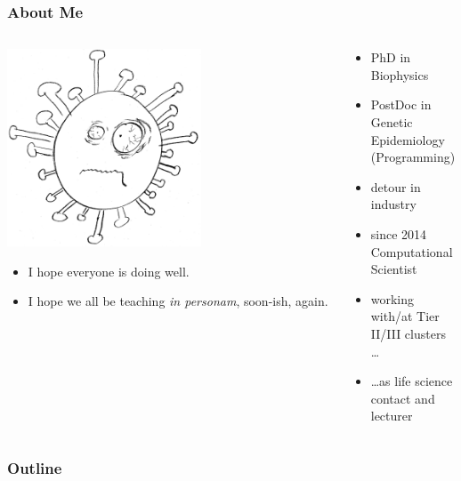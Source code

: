 \documentclass[english,xcolor=pdftex,dvipsnames,compress,aspectratio=169,handout]{beamer}
\begin{document}
\begin{frame}[plain] 
  \frametitle{About Me}
  \begin{columns}
   \begin{column}{0.6\textwidth}
    \centering
    \includegraphics[width=0.6\textwidth]{images/virus}\newline
    {\scriptsize
    \begin{itemize}
     \item I hope everyone is doing well.
     \item I hope we all be teaching \emph{in personam}, soon-ish, again.
    \end{itemize}

    }
   \end{column}
   \begin{column}{0.4\textwidth}
    \pause
    \begin{itemize}[<+->]
     \item PhD in Biophysics
     \item PostDoc in Genetic Epidemiology (Programming)
     \item detour in industry
     \item since 2014 Computational Scientist
     \item working with/at Tier II/III clusters \ldots
     \item \ldots as life science contact and lecturer
    \end{itemize}
   \end{column}
  \end{columns}
\end{frame}

\begin{frame}
    \frametitle{Outline}
    \tableofcontents
\end{frame}
\end{document}
